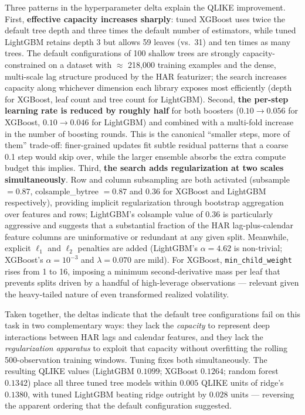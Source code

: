 Three patterns in the hyperparameter delta explain the QLIKE improvement. First, \textbf{effective capacity increases sharply}: tuned XGBoost uses twice the default tree depth and three times the default number of estimators, while tuned LightGBM retains depth 3 but allows 59 leaves (vs.\ 31) and ten times as many trees. The default configurations of 100 shallow trees are strongly capacity-constrained on a dataset with $\approx$ 218{,}000 training examples and the dense, multi-scale lag structure produced by the HAR featurizer; the search increases capacity along whichever dimension each library exposes most efficiently (depth for XGBoost, leaf count and tree count for LightGBM). Second, \textbf{the per-step learning rate is reduced by roughly half} for both boosters ($0.10 \to 0.056$ for XGBoost, $0.10 \to 0.046$ for LightGBM) and combined with a multi-fold increase in the number of boosting rounds. This is the canonical ``smaller steps, more of them'' trade-off: finer-grained updates fit subtle residual patterns that a coarse 0.1 step would skip over, while the larger ensemble absorbs the extra compute budget this implies. Third, \textbf{the search adds regularization at two scales simultaneously}. Row and column subsampling are both activated (subsample $= 0.87$, colsample\_bytree $= 0.87$ and $0.36$ for XGBoost and LightGBM respectively), providing implicit regularization through bootstrap aggregation over features and rows; LightGBM's colsample value of $0.36$ is particularly aggressive and suggests that a substantial fraction of the HAR lag-plus-calendar feature columns are uninformative or redundant at any given split. Meanwhile, explicit $\ell_1$ and $\ell_2$ penalties are added (LightGBM's $\alpha = 4.62$ is non-trivial; XGBoost's $\alpha = 10^{-3}$ and $\lambda = 0.070$ are mild). For XGBoost, \texttt{min\_child\_weight} rises from 1 to 16, imposing a minimum second-derivative mass per leaf that prevents splits driven by a handful of high-leverage observations --- relevant given the heavy-tailed nature of even transformed realized volatility.

Taken together, the deltas indicate that the default tree configurations fail on this task in two complementary ways: they lack the \emph{capacity} to represent deep interactions between HAR lags and calendar features, and they lack the \emph{regularization apparatus} to exploit that capacity without overfitting the rolling 500-observation training windows. Tuning fixes both simultaneously. The resulting QLIKE values (LightGBM $0.1099$; XGBoost $0.1264$; random forest $0.1342$) place all three tuned tree models within $0.005$ QLIKE units of ridge's $0.1380$, with tuned LightGBM beating ridge outright by $0.028$ units --- reversing the apparent ordering that the default configuration suggested.

